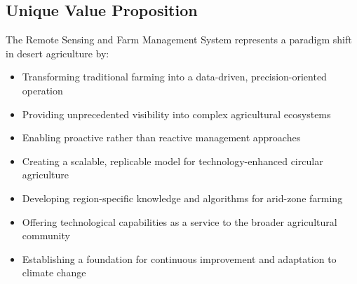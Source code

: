 \subsection{Unique Value Proposition}
The Remote Sensing and Farm Management System represents a paradigm shift in desert agriculture by:

\begin{itemize}
    \item Transforming traditional farming into a data-driven, precision-oriented operation
    \item Providing unprecedented visibility into complex agricultural ecosystems
    \item Enabling proactive rather than reactive management approaches
    \item Creating a scalable, replicable model for technology-enhanced circular agriculture
    \item Developing region-specific knowledge and algorithms for arid-zone farming
    \item Offering technological capabilities as a service to the broader agricultural community
    \item Establishing a foundation for continuous improvement and adaptation to climate change
\end{itemize} 